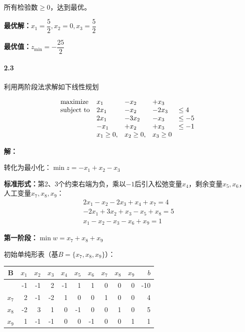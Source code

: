 \documentclass[12pt,a4paper]{article}
\begin{document}
所有检验数$\geq 0$，达到最优。

\textbf{最优解：}$x_1 = \dfrac{5}{2}, x_2 = 0, x_3 = \dfrac{5}{2}$

\textbf{最优值：}$z_{\min} = -\dfrac{25}{2}$

\paragraph{2.3}
利用两阶段法求解如下线性规划

\begin{equation*}
\begin{array}{lllll@{}ll}
\text{maximize}  & x_1&-x_2&+x_3 &\\
\text{subject to}& 2x_1 &-x_2  &-2x_3  &\leq 4 \\
&2x_1 &-3x_2 & -x_3  & \leq -5  \\
&-x_1 &+x_2 &+x_3   & \leq -1  \\
&x_1 \geq 0, &x_2 \geq 0, & x_3 \geq 0 &  
\end{array}
\end{equation*}

\textbf{解：}

转化为最小化：$\min z = -x_1 + x_2 - x_3$

\textbf{标准形式：}第2、3个约束右端为负，乘以$-1$后引入松弛变量$x_4$，剩余变量$x_5, x_6$，人工变量$x_7, x_8, x_9$：
\begin{align*}
& 2x_1 - x_2 - 2x_3 + x_4 + x_7 = 4 \\
& -2x_1 + 3x_2 + x_3 - x_5 + x_8 = 5 \\
& x_1 - x_2 - x_3 - x_6 + x_9 = 1
\end{align*}

\textbf{第一阶段：}$\min w = x_7 + x_8 + x_9$

初始单纯形表（基$B = \{x_7, x_8, x_9\}$）：

\begin{center}
\begin{tabular}{|c|rrrrrrrrr|r|}
\hline
B & $x_1$ & $x_2$ & $x_3$ & $x_4$ & $x_5$ & $x_6$ & $x_7$ & $x_8$ & $x_9$ & $b$ \\
\hline
 & -1 & -1 & 2 & -1 & 1 & 1 & 0 & 0 & 0 & -10 \\
\hline
$x_7$ & 2 & -1 & -2 & 1 & 0 & 0 & 1 & 0 & 0 & 4 \\
$x_8$ & -2 & 3 & 1 & 0 & -1 & 0 & 0 & 1 & 0 & 5 \\
$x_9$ & 1 & -1 & -1 & 0 & 0 & -1 & 0 & 0 & 1 & 1 \\
\hline
\end{tabular}
\end{center}
\end{document}
